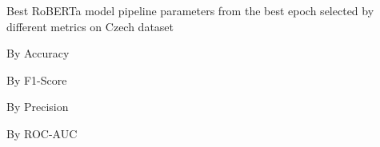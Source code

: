 \begin{table}[!htbp]
    \caption{Best RoBERTa model pipeline parameters from the best epoch selected by different metrics on Czech dataset}
    \label{tab:czech_roberta_pipeline_params}
    \centering

    \begin{subtable}[t]{0.48\linewidth}
        \scriptsize
        \caption{By Accuracy}
        
    \end{subtable}
    \hfill
    \begin{subtable}[t]{0.48\linewidth}
        \scriptsize
        \caption{By F1-Score}
        
    \end{subtable}

    \vspace{1em}

    \begin{subtable}[t]{0.48\linewidth}
        \scriptsize
        \caption{By Precision}
        
    \end{subtable}
    \hfill
    \begin{subtable}[t]{0.48\linewidth}
        \scriptsize
        \caption{By ROC-AUC}
        
    \end{subtable}

\end{table}